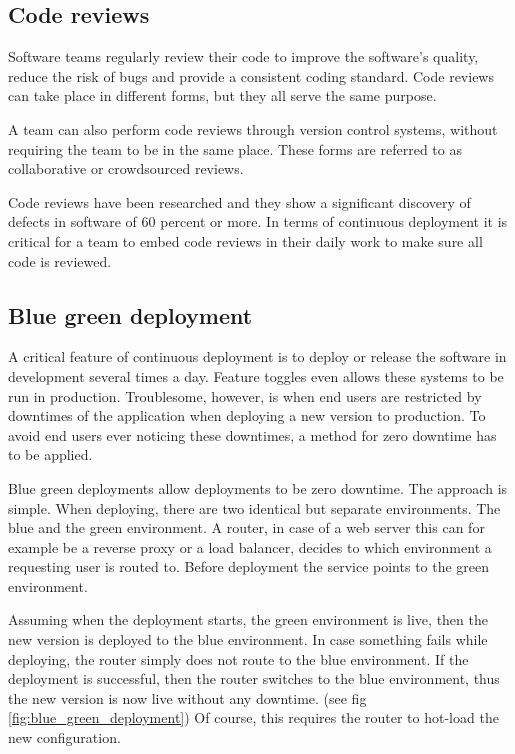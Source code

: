 \subsection{Code reviews}

Software teams regularly review their code to improve the software's quality,
reduce the risk of bugs and provide a consistent coding standard. Code reviews
can take place in different forms, but they all serve the same purpose.

A team can also perform code reviews through version control systems, without
requiring the team to be in the same place. These forms are referred to as
collaborative or crowdsourced reviews.

Code reviews have been researched and they show a significant discovery of
defects in software of 60 percent or more. In terms of continuous deployment it
is critical for a team to embed code reviews in their daily work to make sure
all code is reviewed.

\subsection{Blue green deployment}

A critical feature of continuous deployment is to deploy or release the
software in development several times a day. Feature toggles even allows
these systems to be run in production. Troublesome, however, is when end users
are restricted by downtimes of the application when deploying a new version to
production. To avoid end users ever noticing these downtimes, a method for zero
downtime has to be applied.

Blue green deployments allow deployments to be zero downtime. The approach is
simple. When deploying, there are two identical but separate environments. The
blue and the green environment. A router, in case of a web server this can for
example be a reverse proxy or a load balancer, decides to which environment a
requesting user is routed to. Before deployment the service points to the green
environment.

Assuming when the deployment starts, the green environment is live, then the
new version is deployed to the blue environment. In case something fails while
deploying, the router simply does not route to the blue environment. If the
deployment is successful, then the router switches to the blue environment,
thus the new version is now live without any downtime. (see fig
\ref{fig:blue_green_deployment}) Of course, this requires the router to hot-load the
new configuration.

